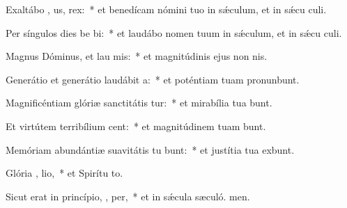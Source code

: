 \item Exaltábo ,  us, rex:~* et benedícam nómini tuo in sǽculum, et in sǽcu culi.
\item Per síngulos dies be bi:~* et laudábo nomen tuum in sǽculum, et in sǽcu culi.
\item Magnus Dóminus, et lau mis:~* et magnitúdinis ejus non  nis.
\item Generátio et generátio laudábit  a:~* et poténtiam tuam pronunbunt.
\item Magnificéntiam glóriæ sanctitátis  tur:~* et mirabília tua bunt.
\item Et virtútem terribílium  cent:~* et magnitúdinem tuam bunt.
\item Memóriam abundántiæ suavitátis tu bunt:~* et justítia tua exbunt.
\item Glória ,  lio,~* et Spirítu to.
\item Sicut erat in princípio,  ,  per,~* et in sǽcula sæculó. men.
